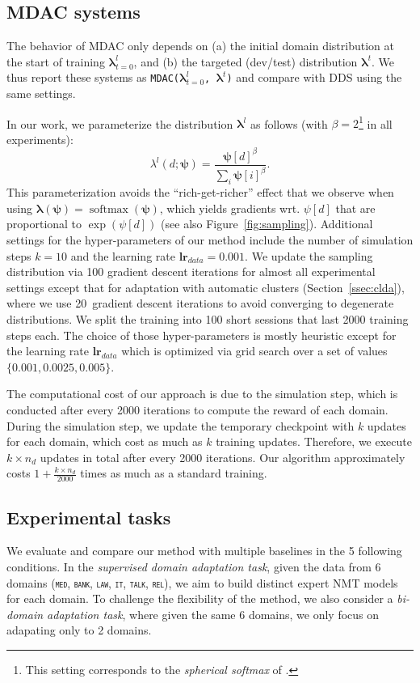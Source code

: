 \documentclass[11pt]{article}
\newcommand{\fyDone}[1]{\done[FY]\Todo[FY:]{\textcolor{orange}{#1}}}
\newcommand{\fyFuture}[1]{\done[FY]\Todo[FY:]{\textcolor{red}{#1}}}
\newcommand{\domain}[1]{\texttt{\textsc{#1}}}
\newcommand{\system}[1]{\texttt{{#1}}}
\newcommand{\vlambda}{\ensuremath{\boldsymbol\lambda}\xspace} %
\newcommand{\vpsi}{\ensuremath{\boldsymbol\psi}\xspace} %
\begin{document}
\subsection{MDAC systems} \label{ssec:dds-sys}
The behavior of MDAC only depends on (a) the initial domain distribution at the start of training $\vlambda^{l}_{t=0}$, and (b) the targeted (dev/test) distribution $\vlambda^{t}$. We thus report these systems as \system{MDAC($\vlambda^{l}_{t=0}$, $\vlambda^{t}$)} and compare with DDS using the same settings.

In our work, we parameterize the distribution $\vlambda^l$ as follows (with $\beta=2$\footnote{This setting corresponds to the \emph{spherical softmax} of \cite{Brebisson16anexploration}.} in all experiments):\fyDone{Explain why}
\begin{equation}
\lambda^l(d;\vpsi) = \frac{\vpsi[d]^\beta}{\sum_i \vpsi[i]^\beta}. \nonumber
\end{equation}
This parameterization avoids the ``rich-get-richer'' effect that we observe when using $\vlambda(\vpsi) = \operatorname{softmax}(\vpsi)$, which yields gradients wrt. $\psi[d]$ that are proportional to $\exp(\psi[d])$ (see also Figure~\ref{fig:sampling}). Additional settings for the hyper-parameters of our method include the number of simulation steps $k=10$ and the learning rate $\mathbf{lr}_{data}=0.001$. We update the sampling distribution via 100 gradient descent iterations for almost all experimental settings except that for adaptation with automatic clusters (Section~\ref{ssec:clda}), where we use 20~gradient descent iterations to avoid converging to degenerate distributions.\fyFuture{Why? computation?} We split the training into 100 short sessions that last 2000 training steps each. The choice of those hyper-parameters is mostly heuristic except for the learning rate $\mathbf{lr}_{data}$ which is optimized via grid search over a set of values $\{0.001,0.0025,0.005\}$.

The computational cost of our approach is due to the simulation step, which is conducted after every 2000 iterations to compute the reward of each domain. During the simulation step, we update the temporary checkpoint with $k$ updates for each domain, which cost as much as $k$ training updates. Therefore, we execute $k \times n_d$ updates in total after every 2000 iterations. Our algorithm approximately costs $1 + \frac{k \times n_d}{2000}$ times as much as a standard training.

\subsection{Experimental tasks}
We evaluate and compare our method with multiple baselines in the 5 following conditions.
In the \emph{supervised domain adaptation task}, given the data from 6 domains (\domain{med}, \domain{bank}, \domain{law}, \domain{it}, \domain{talk}, \domain{rel}), we aim to build distinct expert NMT models for each domain. To challenge the flexibility of the method, we also consider a \emph{bi-domain adaptation task}, where given the same 6 domains, we only focus on adapating only to 2 domains.
\end{document}
